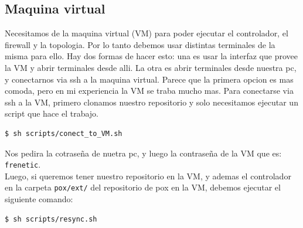 \subsection{Maquina virtual}
	Necesitamos de la maquina virtual (VM) para poder ejecutar el controlador, el firewall y la topologia. Por lo tanto debemos usar 		distintas terminales de la misma para ello. Hay dos formas de hacer esto: una es usar la interfaz que provee la VM y abrir terminales 		desde alli. La otra es abrir terminales desde nuestra pc, y conectarnos via ssh a la maquina virtual. Parece que la primera opcion es 		mas comoda, pero en mi experiencia la VM se traba mucho mas.
	Para conectarse via ssh a la VM, primero clonamos nuestro repositorio y solo necesitamos ejecutar un script que hace el trabajo.
	\begin{lstlisting}[language=bash,numbers=none]
	 	$ sh scripts/conect_to_VM.sh
	\end{lstlisting}	
	Nos pedira la cotraseña de nuetra pc, y luego la contraseña de la VM que es: \lstinline[columns=fixed]{frenetic}.\\
	Luego, si queremos tener nuestro repositorio en la VM, y ademas el controlador en la carpeta \lstinline[columns=fixed]{pox/ext/} del 		repositorio de pox en la VM, debemos ejecutar el siguiente comando:\\
	\begin{lstlisting}[language=bash,numbers=none]
		$ sh scripts/resync.sh
	\end{lstlisting}
